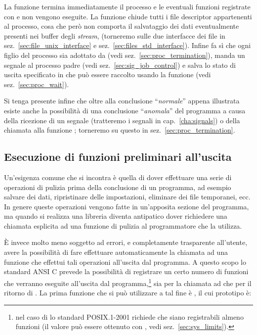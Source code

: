 La funzione termina immediatamente il processo e le eventuali funzioni
registrate con  e  non vengono eseguite. La
funzione chiude tutti i file descriptor appartenenti al processo, cosa che
però non comporta il salvataggio dei dati eventualmente presenti nei buffer
degli \textit{stream}, (torneremo sulle due interfacce dei file in
sez.~\ref{sec:file_unix_interface} e
sez.~\ref{sec:files_std_interface}). Infine fa sì che ogni figlio del processo
sia adottato da  (vedi sez.~\ref{sec:proc_termination}), manda un
segnale  al processo padre (vedi
sez.~\ref{sec:sig_job_control}) e salva lo stato di uscita specificato in
 che può essere raccolto usando la funzione  (vedi
sez.~\ref{sec:proc_wait}).

Si tenga presente infine che oltre alla conclusione ``\textsl{normale}''
appena illustrata esiste anche la possibilità di una conclusione
``\textsl{anomala}'' del programma a causa della ricezione di un segnale
(tratteremo i segnali in cap.~\ref{cha:signals}) o della chiamata alla
funzione ; torneremo su questo in sez.~\ref{sec:proc_termination}.


\subsection{Esecuzione di funzioni preliminari all'uscita}
\label{sec:proc_atexit}

Un'esigenza comune che si incontra è quella di dover effettuare una serie di
operazioni di pulizia prima della conclusione di un programma, ad esempio
salvare dei dati, ripristinare delle impostazioni, eliminare dei file
temporanei, ecc. In genere queste operazioni vengono fatte in un'apposita
sezione del programma, ma quando si realizza una libreria diventa antipatico
dover richiedere una chiamata esplicita ad una funzione di pulizia al
programmatore che la utilizza.

È invece molto meno soggetto ad errori, e completamente trasparente
all'utente, avere la possibilità di fare effettuare automaticamente la
chiamata ad una funzione che effettui tali operazioni all'uscita dal
programma. A questo scopo lo standard ANSI C prevede la possibilità di
registrare un certo numero di funzioni che verranno eseguite all'uscita dal
programma,\footnote{nel caso di  lo standard POSIX.1-2001
  richiede che siano registrabili almeno  funzioni (il
  valore può essere ottenuto con , vedi
  sez.~\ref{sec:sys_limits}).} sia per la chiamata ad  che per il
ritorno di . La prima funzione che si può utilizzare a tal fine è
, il cui prototipo è:

